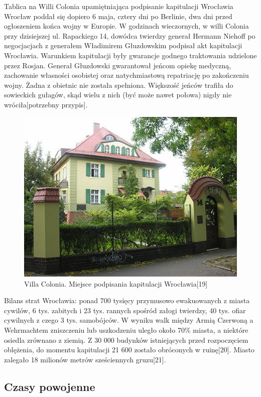 \documentclass{article}
\begin{document}
Tablica na Willi Colonia upamiętniająca podpisanie kapitulacji Wrocławia
Wrocław poddał się dopiero 6 maja, cztery dni po Berlinie, dwa dni przed ogłoszeniem końca wojny w Europie. W godzinach wieczornych, w willi Colonia przy dzisiejszej ul. Rapackiego 14, dowódca twierdzy generał Hermann Niehoff po negocjacjach z generałem Władimirem Głuzdowskim podpisał akt kapitulacji Wrocławia. Warunkiem kapitulacji były gwarancje godnego traktowania udzielone przez Rosjan. Generał Głuzdowski gwarantował jeńcom opiekę medyczną, zachowanie własności osobistej oraz natychmiastową repatriację po zakończeniu wojny. Żadna z obietnic nie została spełniona. Większość jeńców trafiła do sowieckich gułagów, skąd wielu z nich (być może nawet połowa) nigdy nie wróciła[potrzebny przypis].

 \begin{figure}[h!]
\centering
\includegraphics[scale=1]{15.jpg}
\caption{Villa Colonia. Miejsce podpisania kapitulacji Wrocławia[19]}
\end{figure}
Bilans strat Wrocławia: ponad 700 tysięcy przymusowo ewakuowanych z miasta cywilów, 6 tys. zabitych i 23 tys. rannych spośród załogi twierdzy, 40 tys. ofiar cywilnych z czego 3 tys. samobójców. W wyniku walk między Armią Czerwoną a Wehrmachtem zniszczeniu lub uszkodzeniu uległo około 70\% miasta, a niektóre osiedla zrównano z ziemią. Z 30 000 budynków istniejących przed rozpoczęciem oblężenia, do momentu kapitulacji 21 600 zostało obróconych w ruinę[20]. Miasto zalegało 18 milionów metrów sześciennych gruzu[21].

\subsection{Czasy powojenne}
\end{document}
